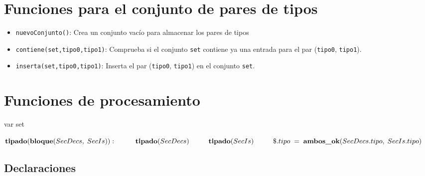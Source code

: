 \section{Funciones para el conjunto de pares de tipos}

\begin{itemize}
    \item \texttt{nuevoConjunto()}: Crea un conjunto vacío para almacenar los pares de tipos
    \item \texttt{contiene(set,tipo0,tipo1)}: Comprueba si el conjunto \texttt{set} contiene ya una entrada para el par (\texttt{tipo0}, \texttt{tipo1}).
    \item \texttt{inserta(set,tipo0,tipo1)}: Inserta el par (\texttt{tipo0}, \texttt{tipo1}) en el conjunto \texttt{set}.
\end{itemize}

\section{Funciones de procesamiento}

var set

\begin{math}
    \textbf{tipado}(\textbf{bloque}(SecDecs, \; SecIs)): \\
        \phantom{---} \textbf{tipado}(SecDecs) \\
        \phantom{---} \textbf{tipado}(SecIs) \\
        \phantom{---} \$.tipo \; = \; \textbf{ambos\_ok}(SecDecs.tipo, \; SecIs.tipo)
\end{math}

\subsection{Declaraciones}

